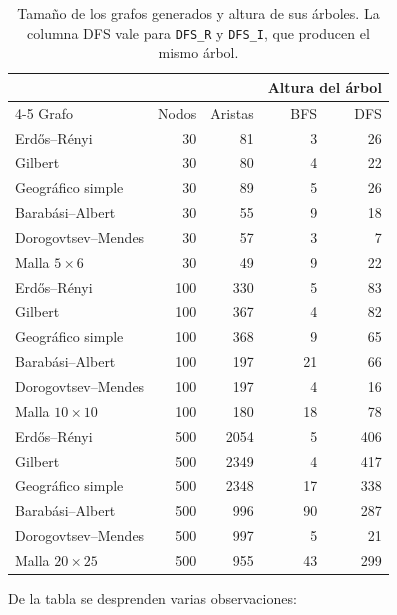 \documentclass[11pt,letterpaper]{article}
\begin{document}
\begin{table}[H]
\centering
\begin{tabular}{lrrrr}
\toprule
 & & & \multicolumn{2}{c}{Altura del árbol} \\
\cmidrule(l){4-5}
Grafo & Nodos & Aristas & BFS & DFS \\
\midrule
Erd\H{o}s--Rényi & 30 & 81 & 3 & 26 \\
Gilbert & 30 & 80 & 4 & 22 \\
Geográfico simple & 30 & 89 & 5 & 26 \\
Barabási--Albert & 30 & 55 & 9 & 18 \\
Dorogovtsev--Mendes & 30 & 57 & 3 & 7 \\
Malla $5 \times 6$ & 30 & 49 & 9 & 22 \\
\midrule
Erd\H{o}s--Rényi & 100 & 330 & 5 & 83 \\
Gilbert & 100 & 367 & 4 & 82 \\
Geográfico simple & 100 & 368 & 9 & 65 \\
Barabási--Albert & 100 & 197 & 21 & 66 \\
Dorogovtsev--Mendes & 100 & 197 & 4 & 16 \\
Malla $10 \times 10$ & 100 & 180 & 18 & 78 \\
\midrule
Erd\H{o}s--Rényi & 500 & 2054 & 5 & 406 \\
Gilbert & 500 & 2349 & 4 & 417 \\
Geográfico simple & 500 & 2348 & 17 & 338 \\
Barabási--Albert & 500 & 996 & 90 & 287 \\
Dorogovtsev--Mendes & 500 & 997 & 5 & 21 \\
Malla $20 \times 25$ & 500 & 955 & 43 & 299 \\
\bottomrule
\end{tabular}
\caption{Tamaño de los grafos generados y altura de sus árboles. La columna DFS
vale para \texttt{DFS\_R} y \texttt{DFS\_I}, que producen el mismo árbol.}
\label{tab:alturas}
\end{table}

De la tabla se desprenden varias observaciones:
\end{document}
